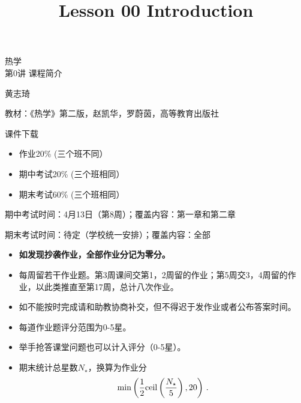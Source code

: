 \documentclass[CJK]{beamer}
\title{Lesson 00 Introduction}
\author{}
\date{}
\begin{document}
\begin{frame}
\begin{center}
\begin{Large}
\bch
热学 \\
第0讲 课程简介

{\vskip 0.3in}

黄志琦

\ech
\end{Large}
\end{center}

\vskip 0.2in

\bch
教材：《热学》第二版，赵凯华，罗蔚茵，高等教育出版社
\ech

\bch
课件下载
\ech
\courseurl
\end{frame}




\begin{frame}
\bch

\begin{itemize}
\item{作业20\% (三个班不同）}
\item{期中考试20\% (三个班相同）}
\item{期末考试60\% (三个班相同）}
\end{itemize}

\skipline

期中考试时间：4月13日（第8周）；覆盖内容：第一章和第二章

期末考试时间：待定（学校统一安排）；覆盖内容：全部
\ech
\end{frame}


\begin{frame}
\bch
\begin{itemize}
\item{{\bf 如发现抄袭作业，全部作业分记为零分。}}
\item{每周留若干作业题。第3周课间交第1，2周留的作业；第5周交3，4周留的作业，以此类推直至第17周，总计八次作业。}
\item{如不能按时完成请和助教协商补交，但不得迟于发作业或者公布答案时间。}
\item{每道作业题评分范围为0-5星。}
\item{举手抢答课堂问题也可以计入评分（0-5星）。}
\item{期末统计总星数$N_\star$，换算为作业分
$$ \min\left( \frac{1}{2}{\rm ceil}\left(\frac{N_\star}{5}\right), 20\right) \, . $$}
\end{itemize}

\ech
\end{frame}
\end{document}
